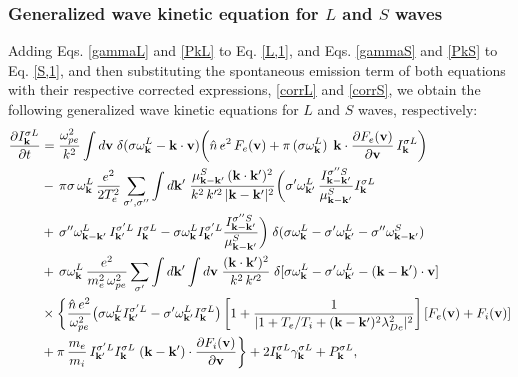 \documentclass[12pt,a4paper,ruledheader]{report}
\begin{document}
\subsubsection{Generalized wave kinetic equation for $L$ and $S$ waves}
Adding Eqs. \eqref{gammaL} and \eqref{PkL} to Eq. \eqref{L,1},
and Eqs. \eqref{gammaS} and \eqref{PkS} to Eq. \eqref{S,1}, and
then substituting the spontaneous emission term of both equations
with their respective corrected expressions, \eqref{corrL} and
\eqref{corrS}, we obtain the following generalized wave kinetic
equations for $L$ and $S$ waves, respectively:
\begin{equation}
  \label{L-gen}
  \begin{split}
\frac{\partial I_{\bf k}^{\sigma L}}{\partial t}
&=\frac{\omega_{pe}^2}{k^2}\int d{\bf v}\;
\delta(\sigma\omega_{\bf k}^L-{\bf k}\cdot{\bf v})
\biggl(\hat{n}\,e^2\,F_e({\bf v})+\pi\,(\sigma\omega_{\bf k}^L)\,
\;{\bf k}\cdot\frac{\partial F_e({\bf v})}{\partial{\bf v}}
\,I_{\bf k}^{\sigma L}\biggr)\\
&-\,\pi\sigma\,\omega_{\bf k}^L
\,\frac{e^2}{2T_e^2}\sum_{\sigma ',\sigma ''}\int d{\bf k'}\;
\frac{\mu_{{\bf k}-{\bf k}'}^S
\,({\bf k}\cdot{\bf k}')^2}{k^2\,k'^2\,|{\bf k}-{\bf k}'|^2}
\biggl(\sigma '\omega_{{\bf k}'}^L\,
\frac{I_{{\bf k}-{\bf k}'}^{\sigma ''S}}{\mu_{{\bf k}-{\bf k}'}^S}
I_{\bf k}^{\sigma L}\\
&+\,\sigma ''\omega_{{\bf k}-{\bf k}'}^L
\,I_{{\bf k}'}^{\sigma 'L}\,I_{\bf k}^{\sigma L}
-\sigma\omega_{\bf k}^L I_{{\bf k}'}^{\sigma 'L}
\frac{I_{{\bf k}-{\bf k}'}^{\sigma ''S}}
{\mu_{{\bf k}-{\bf k}'}^S}\biggr)
\;\delta(\sigma\omega_{\bf k}^L-\sigma '\omega_{{\bf k}'}^L
-\sigma ''\omega_{{\bf k}-{\bf k}'}^S)\\
&+\,\sigma\omega_{\bf k}^L\,\frac{e^2}{m_e^2\,\omega_{pe}^2}
\sum_{\sigma '}\int d{\bf k'}\int d{\bf v}\;
\frac{({\bf k}\cdot{\bf k}')^2}{k^2\,k'^2}\;\delta[\sigma\omega_{\bf k}^L
-\sigma '\omega_{{\bf k}'}^L-({\bf k}-{\bf k}')\cdot{\bf v}]\\
&\times\biggl\{\frac{\hat{n}\,e^2}{\omega_{pe}^2}
\bigl(\sigma\omega_{\bf k}^LI_{{\bf k}'}^{\sigma 'L}
  -\sigma '\omega_{{\bf k}'}^L I_{\bf k}^{\sigma L}\bigr)
  \left[1+ \frac{1}{|1+T_e/T_i+({\bf k-k'})^2 \lambda_{De}^2|^2} \right]
[F_e({\bf v})+F_i({\bf v})]\\
&+\pi\,\frac{m_e}{m_i}\,I_{{\bf k}'}^{\sigma 'L}
I_{\bf k}^{\sigma L}\;({\bf k}-{\bf k}')
\cdot\frac{\partial F_i({\bf v})}{\partial{\bf v}}\biggr\}
+2 I_{\bf k}^{\sigma L} \gamma_{\bf k}^{\sigma L}+ P_{\bf k}^{\sigma L},
  \end{split}
\end{equation}
\end{document}

